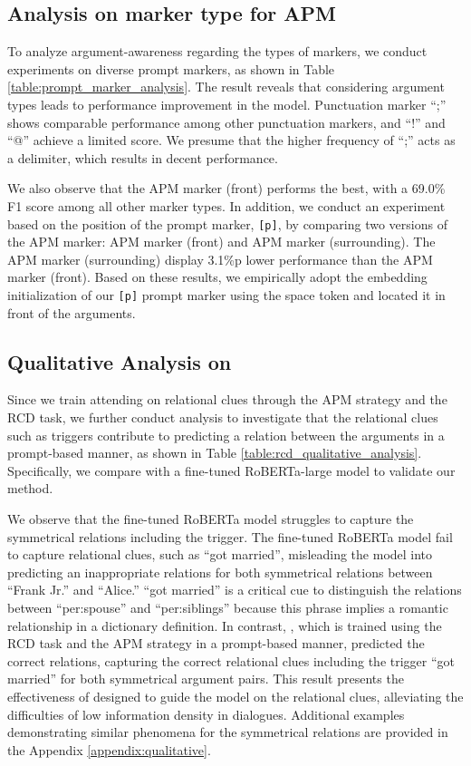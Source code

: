\documentclass[11pt]{article}
\begin{document}
\subsection{Analysis on marker type for APM}

To analyze argument-awareness regarding the types of markers, we conduct experiments on diverse prompt markers, as shown in Table \ref{table:prompt_marker_analysis}. The result reveals that considering argument types leads to performance improvement in the model. Punctuation marker ``;'' shows comparable performance among other punctuation markers, and ``!'' and ``@'' achieve a limited score. We presume that the higher frequency of ``;'' acts as a delimiter, which results in decent performance. 

We also observe that the APM marker (front) performs the best, with a 69.0\% F1 score among all other marker types. In addition, we conduct an experiment based on the position of the prompt marker, \texttt{[p]}, by comparing two versions of the APM marker: APM marker (front) and APM marker (surrounding). The APM marker (surrounding) display 3.1\%p lower performance than the APM marker (front). Based on these results, we empirically adopt the embedding initialization of our \texttt{[p]} prompt marker using the space token and located it in front of the arguments.

\subsection{Qualitative Analysis on }
\label{subsec:qualitative}
Since we train  attending on relational clues through the APM strategy and the RCD task, we further conduct analysis to investigate that the relational clues such as triggers contribute to predicting a relation between the arguments in a prompt-based manner, as shown in Table \ref{table:rcd_qualitative_analysis}. Specifically, we compare  with a fine-tuned RoBERTa-large model to validate our method.

We observe that the fine-tuned RoBERTa model struggles to capture the symmetrical relations including the trigger. The fine-tuned RoBERTa model fail to capture relational clues, such as ``got married'', misleading the model into predicting an inappropriate relations for both symmetrical relations between ``Frank Jr.'' and ``Alice.'' ``got married'' is a critical cue to distinguish the relations between ``per:spouse'' and ``per:siblings'' because this phrase implies a romantic relationship in a dictionary definition. 
In contrast, , which is trained using the RCD task and the APM strategy in a prompt-based manner, predicted the correct relations, capturing the correct relational clues including the trigger ``got married'' for both symmetrical argument pairs. This result presents the effectiveness of  designed to guide the model on the relational clues, alleviating the difficulties of low information density in dialogues.
Additional examples demonstrating similar phenomena for the symmetrical relations are provided in the Appendix \ref{appendix:qualitative}.
\end{document}

